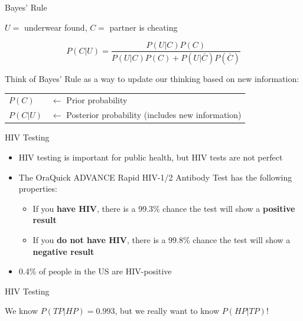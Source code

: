 \documentclass{beamer}\usepackage[]{graphicx}\usepackage[]{color}
\begin{document}
\begin{darkframes}
\begin{frame}{Bayes' Rule}
\begin{center}
        \bigskip
        
        $U=$ underwear found, $C=$ partner is cheating
      \end{center}

      \[
        P(C|U) = \frac{P(U|C)P(C)}{P(U|C)P(C) + P(U|\overline C)P(\overline C)}
      \]
    \end{frame}
    
    \begin{frame}
      Think of Bayes' Rule as a way to update our thinking based on new information:

      \bigskip

      \begin{center}
        \begin{tabular}{ll}
          $P(C)$ & $\longleftarrow$ Prior probability \\
          $P(C|U)$ & $\longleftarrow$ Posterior probability (includes new information) \\
        \end{tabular}
      \end{center}
    \end{frame}

    \begin{frame}{HIV Testing}
      \begin{itemize}[<+->]
        \item HIV testing is important for public health, but HIV tests are not perfect
        \item The OraQuick ADVANCE Rapid HIV-1/2 Antibody Test has the following properties:
          \begin{itemize}
            \item If you \textbf{have HIV}, there is a 99.3\% chance the test will show a \textbf{positive result}
            \item If you \textbf{do not have HIV}, there is a 99.8\% chance the test will show a \textbf{negative result}
          \end{itemize}
        \item 0.4\% of people in the US are HIV-positive
      \end{itemize}
    \end{frame}

    \begin{frame}{HIV Testing}
      \begin{center}
        We know $P(TP|HP) = 0.993$, but we really want to know $P(HP|TP)$!
      \end{center}
    \end{frame}


\end{darkframes}
\end{document}

